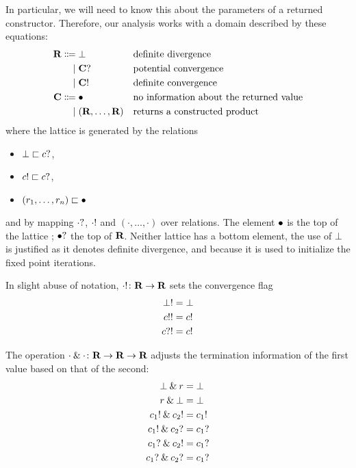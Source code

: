 \documentclass[parskip=half]{scrartcl}
\newcommand{\both}[2]{#1\mathbin{\&}#2}
\begin{document}
In particular, we will need to know this about the parameters of a returned constructor. Therefore, our analysis works with a domain described by these equations:
\begin{align*}
\textbf{R} \Coloneqq{} & \bot && \text{definite divergence}\\
\mid{} &\textbf{C}? && \text{potential convergence}\\
\mid{} &\textbf{C}! && \text{definite convergence}\\
\textbf{C} \Coloneqq{} & \bullet && \text{no information about the returned value} \\
\mid{} & (\textbf{R},\ldots, \textbf{R}) && \text{returns a constructed product}
\end{align*}
where the lattice is generated by the relations
\begin{itemize}
\item $\bot \sqsubset c?$,
\item $c! \sqsubset c?$,
\item $(r_1,\ldots, r_n) \sqsubset \bullet$
\end{itemize}
and by mapping $\cdot?$, $\cdot!$ and $(\cdot,\ldots,\cdot)$ over relations. The element $\bullet$ is the top of the lattice \dC; $\bullet?$ the top of $\textbf{R}$. Neither lattice has a bottom element, the use of $\bot$ is justified as it denotes definite divergence, and because it is used to initialize the fixed point iterations.

In slight abuse of notation, $\cdot! \colon \textbf{R} \to\textbf{R}$ sets the convergence flag
\begin{align*}
\bot! &= \bot \\
c!! &= c! \\
c?! &= c!
\end{align*}

The operation $\both{\cdot}{\cdot} \colon \dR \to \dR \to \dR$ adjusts the termination information of the first value based on that of the second:
\begin{align*}
\both{\bot}r &= \bot \\
\both r{\bot} &= \bot \\
\both{\conv{c_1}}{\conv{c_2}} &= \conv{c_1} \\
\both{\conv{c_1}}{\dunno{c_2}} &= \dunno{c_1} \\
\both{\dunno{c_1}}{\conv{c_2}} &= \dunno{c_1} \\
\both{\dunno{c_1}}{\dunno{c_2}} &= \dunno{c_1}
\end{align*}
\end{document}
